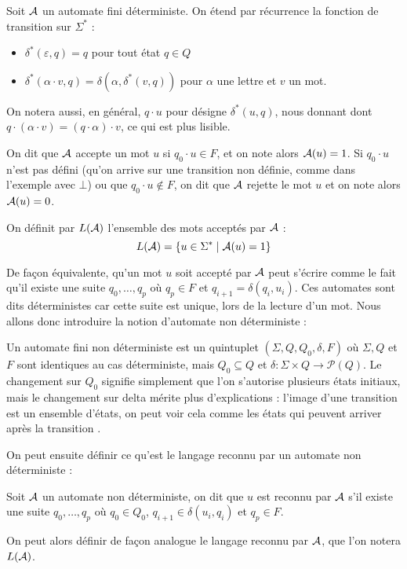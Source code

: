  \begin{defi}
     Soit $\mathcal A$ un automate fini déterministe. On étend par récurrence la fonction de transition sur $\Sigma^*$ : \begin{itemize}[label=$\bullet$]
         \item $\delta^*(\varepsilon,q) = q$ pour tout état $q\in Q$
         \item $\delta^*(\alpha\cdot v,q) = \delta(\alpha,\delta^*(v,q))$ pour $\alpha$ une lettre et $v$ un mot.
     \end{itemize}

     On notera aussi, en général, $q\cdot u$ pour désigne $\delta^*(u,q)$, nous donnant dont $q\cdot (\alpha\cdot v) = (q\cdot \alpha)\cdot v$, ce qui est plus lisible.

     On dit que $\mathcal A$ accepte un mot $u$ si $q_0\cdot u \in F$, et on note alors $\mathcal A(u)=1$. Si $q_0\cdot u$ n'est pas défini (qu'on arrive sur une transition non définie, comme dans l'exemple avec $\bot$) ou que $q_0\cdot u \notin F$, on dit que $\mathcal A$ rejette le mot $u$ et on note alors $\mathcal A(u)=0$.

     On définit par $L(\mathcal A)$ l'ensemble des mots acceptés par $\mathcal A$ : $$L(\mathcal A) =\{u\in \Sigma^*\mid \mathcal A(u)=1\}$$
 \end{defi}

 De façon équivalente, qu'un mot $u$ soit accepté par $\mathcal A$ peut s'écrire comme le fait qu'il existe une suite $q_0,\ldots,q_p$ où $q_p\in F$ et $q_{i+1}=\delta(q_i,u_i)$. Ces automates sont dits déterministes car cette suite est unique, lors de la lecture d'un mot. Nous allons donc introduire la notion d'automate non déterministe :

 \begin{defi}
     Un automate fini non déterministe est un quintuplet $(\Sigma,Q,Q_0,\delta,F)$ où $\Sigma,Q$ et $F$ sont identiques au cas déterministe, mais $Q_0\subseteq Q$ et $\delta : \Sigma \times Q \to \mathcal P(Q)$. Le changement sur $Q_0$ signifie simplement que l'on s'autorise plusieurs états initiaux, mais le changement sur delta mérite plus d'explications : l'image d'une transition est un ensemble d'états, on peut voir cela comme \og les états qui peuvent arriver après la transition \fg{}.
 \end{defi}

 On peut ensuite définir ce qu'est le langage reconnu par un automate non déterministe :

 \begin{defi}
     Soit $\mathcal A$ un automate non déterministe, on dit que $u$ est reconnu par $\mathcal A$ s'il existe une suite $q_0,\ldots,q_p$ où $q_0\in Q_0$, $q_{i+1}\in \delta(u_i,q_i)$ et $q_p\in F$.

     On peut alors définir de façon analogue le langage reconnu par $\mathcal A$, que l'on notera $L(\mathcal A)$.
 \end{defi}

